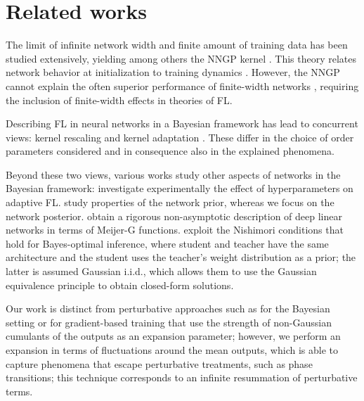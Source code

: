 \section{Related works}
The limit of infinite network width and finite amount of training
data has been studied extensively, yielding among others the NNGP
kernel \cite{Neal1995BayesianLF,Williams98_1203,Lee18,Matthews18,avidan2024}.
This theory relates network behavior at initialization to training
dynamics \cite{Poole16_3360,Pennington17_04735,Schoenholz17_01232,Xiao18_05393}.
However, the NNGP cannot explain the often superior performance of
finite-width networks \cite{Li15_196,Chizat19_neurips,Lee20_ad086f59,Aitchison2020,Refinetti21_8936},
requiring the inclusion of finite-width effects in theories of FL.

Describing FL in neural networks in a Bayesian framework has lead
to concurrent views: kernel rescaling \cite{Li21_031059,Li2022,Pacelli23_1497,bassetti2024,Baglioni24_027301}
and kernel adaptation \cite{Naveh21_NeurIPS,seroussi23_908,Fischer24_10761,Rubin24_iclr}.
These differ in the choice of order parameters considered and in consequence
also in the explained phenomena.

Beyond these two views, various works study other aspects of networks
in the Bayesian framework: \citet{Canatar22_ieee} investigate experimentally
the effect of hyperparameters on adaptive FL. \citet{ZavatoneVeth21_NeurIPS_I}
study properties of the network prior, whereas we focus on the network
posterior. \citet{Hanin23} obtain a rigorous non-asymptotic description
of deep linear networks in terms of Meijer-G functions. \citet{Cui23_6468}
exploit the Nishimori conditions that hold for Bayes-optimal inference,
where student and teacher have the same architecture and the student
uses the teacher's weight distribution as a prior; the latter is assumed
Gaussian i.i.d., which allows them to use the Gaussian equivalence
principle \cite{Goldt20_14709} to obtain closed-form solutions.

Our work is distinct from perturbative approaches such as \cite{Antognini19_arxiv,Naveh21_064301,Cohen21_023034,Roberts22,Hanin24,Halverson21_035002}
for the Bayesian setting or \cite{Dyer20_ICLR,Huang20_4542,Aitken20_06687,Roberts22,Bordelon23_114009,buzaglo2024}
for gradient-based training that use the strength of non-Gaussian
cumulants of the outputs as an expansion parameter; however, we perform
an expansion in terms of fluctuations around the mean outputs, which
is able to capture phenomena that escape perturbative treatments,
such as phase transitions; this technique corresponds to an infinite
resummation of perturbative terms.

